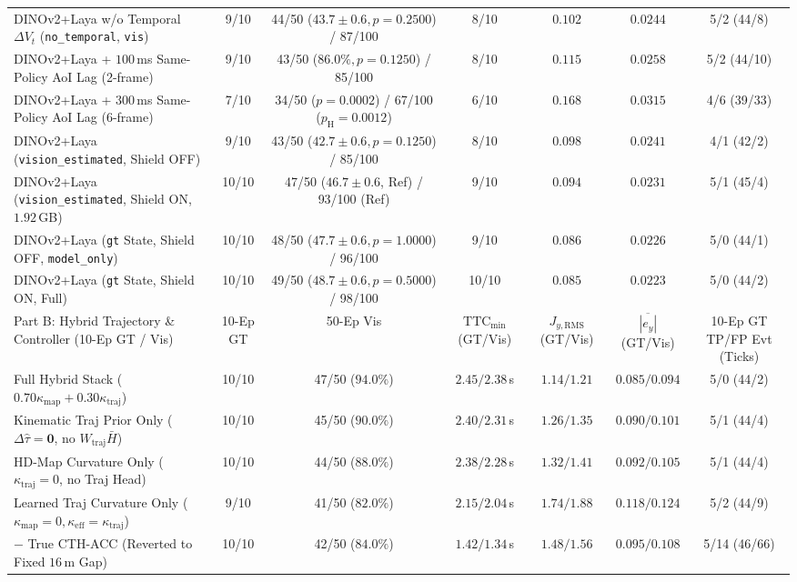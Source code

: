 \documentclass[10pt,twocolumn,letterpaper]{article}
\begin{document}
\begin{table}[t]
{\begin{tabular}{lcccccc}
DINOv2+Laya w/o Temporal $\Delta V_t$ (\texttt{no\_temporal}, \texttt{vis}) & 9/10 & 44/50 ($43.7{\pm}0.6, p{=}0.2500$) / 87/100 & 8/10 & $0.102$ & $0.0244$ & 5/2 (44/8) \\
DINOv2+Laya + $100$\,ms Same-Policy AoI Lag (2-frame) & 9/10 & 43/50 ($86.0\%, p{=}0.1250$) / 85/100 & 8/10 & $0.115$ & $0.0258$ & 5/2 (44/10) \\
DINOv2+Laya + $300$\,ms Same-Policy AoI Lag (6-frame) & 7/10 & 34/50 ($p{=}0.0002$) / 67/100 ($p_{\text{H}}{=}0.0012$) & 6/10 & $0.168$ & $0.0315$ & 4/6 (39/33) \\
DINOv2+Laya (\texttt{vision\_estimated}, Shield OFF) & 9/10 & 43/50 ($42.7{\pm}0.6, p{=}0.1250$) / 85/100 & 8/10 & $0.098$ & $0.0241$ & 4/1 (42/2) \\
DINOv2+Laya (\texttt{vision\_estimated}, Shield ON, $1.92$\,GB) & 10/10 & 47/50 ($46.7{\pm}0.6$, Ref) / 93/100 (Ref) & 9/10 & $0.094$ & $0.0231$ & 5/1 (45/4) \\
DINOv2+Laya (\texttt{gt} State, Shield OFF, \texttt{model\_only}) & 10/10 & 48/50 ($47.7{\pm}0.6, p{=}1.0000$) / 96/100 & 9/10 & $0.086$ & $0.0226$ & 5/0 (44/1) \\
DINOv2+Laya (\texttt{gt} State, Shield ON, Full) & 10/10 & 49/50 ($48.7{\pm}0.6, p{=}0.5000$) / 98/100 & 10/10 & $0.085$ & $0.0223$ & 5/0 (44/2) \\
\midrule
Part B: Hybrid Trajectory \& Controller (10-Ep GT / Vis) & 10-Ep GT & 50-Ep Vis & $\text{TTC}_{\min}$ (GT/Vis) & $J_{y,\text{RMS}}$ (GT/Vis) & $\overline{|e_y|}$ (GT/Vis) & 10-Ep GT TP/FP Evt (Ticks) \\
\midrule
Full Hybrid Stack ($0.70\kappa_{\text{map}} + 0.30\kappa_{\text{traj}}$) & 10/10 & 47/50 ($94.0\%$) & $2.45 / 2.38$\,s & $1.14 / 1.21$ & $0.085 / 0.094$ & 5/0 (44/2) \\
Kinematic Traj Prior Only ($\Delta\hat{\tau}=\mathbf{0}$, no $W_{\text{traj}}\bar{H}$) & 10/10 & 45/50 ($90.0\%$) & $2.40 / 2.31$\,s & $1.26 / 1.35$ & $0.090 / 0.101$ & 5/1 (44/4) \\
HD-Map Curvature Only ($\kappa_{\text{traj}}=0$, no Traj Head) & 10/10 & 44/50 ($88.0\%$) & $2.38 / 2.28$\,s & $1.32 / 1.41$ & $0.092 / 0.105$ & 5/1 (44/4) \\
Learned Traj Curvature Only ($\kappa_{\text{map}}=0, \kappa_{\text{eff}}=\kappa_{\text{traj}}$) & 9/10 & 41/50 ($82.0\%$) & $2.15 / 2.04$\,s & $1.74 / 1.88$ & $0.118 / 0.124$ & 5/2 (44/9) \\
$-$ True CTH-ACC (Reverted to Fixed $16$\,m Gap) & 10/10 & 42/50 ($84.0\%$) & $1.42 / 1.34$\,s & $1.48 / 1.56$ & $0.095 / 0.108$ & 5/14 (46/66) \\

\end{tabular}}
\end{table}
\end{document}
